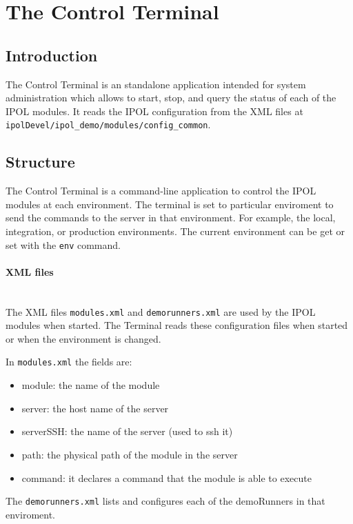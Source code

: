 \section{The Control Terminal}

\subsection{Introduction}
The Control Terminal is an standalone application intended for system administration which allows to start, stop, and query the status of each of the IPOL modules. It reads the IPOL configuration from the XML files at {\tt ipolDevel/ipol\_demo/modules/config\_common}.

\subsection{Structure}
The Control Terminal is a command-line application to control the IPOL modules at each environment. The terminal is set to particular  enviroment to send the commands to the server in that environment. For example, the local, integration, or production environments. The current environment can be get or set with the {\tt env} command.

\paragraph{XML files} \hspace{0pt} \\
The XML files {\tt modules.xml} and {\tt demorunners.xml} are used by the IPOL modules when started. The Terminal reads these configuration files when started or when the environment is changed.

In {\tt modules.xml} the fields are:
\begin{itemize}
    \item module: the name of the module
    \item server: the host name of the server
    \item serverSSH: the name of the server (used to ssh it)
    \item path: the physical path of the module in the server
    \item command: it declares a command that the module is able to execute
\end{itemize}

The {\tt demorunners.xml} lists and configures each of the demoRunners in that enviroment.

